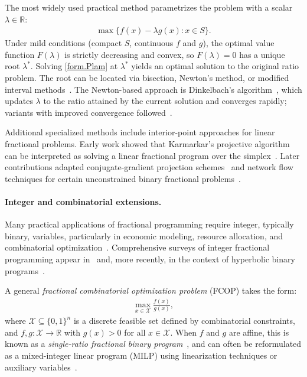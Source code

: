 The most widely used practical method parametrizes the problem with a
scalar $\lambda \in \mathbb{R}$:
\begin{align}
\label{form.Plam}
    \max \{ f(x) - \lambda g(x) : x \in S \}.
\end{align}
Under mild conditions (compact $S$, continuous $f$ and $g$), the
optimal value function $F(\lambda)$ is strictly decreasing and convex,
so $F(\lambda) = 0$ has a unique root $\lambda^*$. Solving
\eqref{form.Plam} at $\lambda^*$ yields an optimal solution to the
original ratio problem. The root can be located via bisection,
Newton's method, or modified interval methods~\citep{ibaraki1983parametric,
schaible1983fractional}. The Newton-based approach is Dinkelbach's algorithm~\citep{dinkelbach1967nonlinear}, which updates $\lambda$ to the ratio attained by the current solution and converges rapidly; variants with improved convergence followed~\citep{schaible1976fractional, pardalos1991global}.

Additional specialized methods include interior-point approaches for
linear fractional problems. Early work showed that Karmarkar's
projective algorithm can be interpreted as solving a linear fractional
program over the simplex~\citep{anstreicher1986monotonic}. Later
contributions adapted conjugate-gradient projection
schemes~\citep{TANTAWY2008969} and network flow techniques for certain
unconstrained binary fractional problems~\citep{picard1982network}.

\paragraph{Integer and combinatorial extensions.}
Many practical applications of fractional programming require
integer, typically binary, variables, particularly in economic
modeling, resource allocation, and combinatorial
optimization~\citep{barros1998discrete}. Comprehensive surveys of
integer fractional programming appear in~\cite{barros1998discrete} and,
more recently, in the context of hyperbolic binary
programs~\citep{borrero2017survey}.

A general \emph{fractional combinatorial optimization problem} (FCOP)
takes the form:
\begin{align}
    \label{form.FCOP}
    \max_{x \in \mathcal{X}} \frac{f(x)}{g(x)},
\end{align}
where $\mathcal{X} \subseteq \{0,1\}^n$ is a discrete feasible set
defined by combinatorial constraints, and
$f,g : \mathcal{X} \to \mathbb{R}$ with $g(x) > 0$ for all
$x \in \mathcal{X}$. When $f$ and $g$ are affine, this is known as a
\emph{single-ratio fractional binary program}~\citep{boros2002pseudo,
tawarmalani2002global, wu1997note}, and can often be reformulated as a
mixed-integer linear program (MILP) using linearization techniques or
auxiliary variables~\citep{LI1994590, tawarmalani2002global,
BORRERO2016479}.

